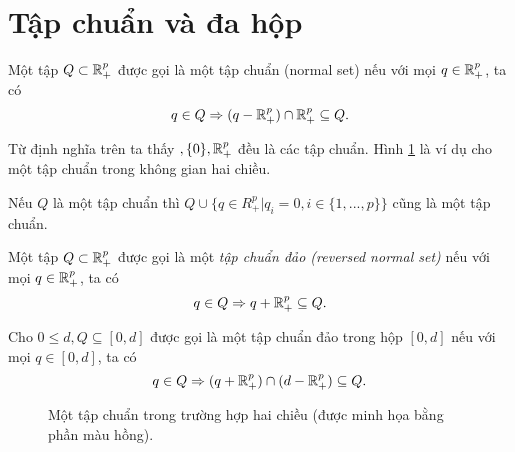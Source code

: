 \section{Tập chuẩn và đa hộp}
\begin{dn} 
Một tập $Q \subset \mathbb{R}^p_+$ được gọi là một tập chuẩn (normal set) nếu với mọi $q \in \mathbb{R}^p_+$, ta có
\begin{equation*}
    q \in Q \Rightarrow (q - \mathbb{R}^p_+) \cap \mathbb{R}^p_+ \subseteq Q \text{.}
\end{equation*}
\end{dn}

\begin{vd}
Từ định nghĩa trên ta thấy $\empty, \{0\}, \R^p_+$ đều là các tập chuẩn. Hình \ref{fig:1} là ví dụ cho một tập chuẩn trong không gian hai chiều.
\end{vd}

\begin{md}
     Nếu $Q$ là một tập chuẩn thì $ Q \cup \{q \in R^p_+ | q_i = 0, i \in \{1, . . . , p\}\}$ cũng là một tập chuẩn.

\end{md}

\begin{dn} 
    Một tập $Q \subset \mathbb{R}^p_+$ được gọi là một \textit{tập chuẩn đảo (reversed normal set)} nếu với mọi $q \in \mathbb{R}^p_+$, ta có
    \begin{equation*}
        q \in Q \Rightarrow q + \mathbb{R}^p_+ \subseteq Q \text{.}
    \end{equation*}
\end{dn}
Cho $0 \leq d, Q \subseteq [0, d]$ được gọi là một tập chuẩn đảo trong hộp $[0, d]$ nếu với mọi $q \in [0, d]$, ta có
\begin{equation*}
    q \in Q \Rightarrow (q + \mathbb{R}^p_+) \cap (d - \mathbb{R}^p_+) \subseteq Q.
\end{equation*}

\begin{figure}[!h]
    \centering
    
    \caption{Một tập chuẩn trong trường hợp hai chiều (được minh họa bằng phần màu hồng).}
    \label{fig:1}
\end{figure}


